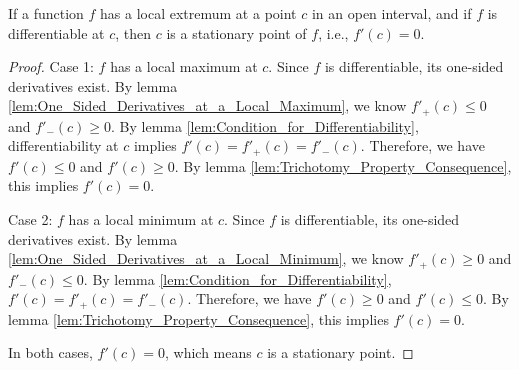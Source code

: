 \begin{theorem}
    \label{thm:Fermats_Theorem_on_Stationary_Points}
    If a function $f$ has a local extremum at a point $c$ in an open interval, and if $f$ is differentiable at $c$, then $c$ is a stationary point of $f$, i.e., $f'(c) = 0$.
\end{theorem}

\begin{proof}
    Case 1: $f$ has a local maximum at $c$.
    Since $f$ is differentiable, its one-sided derivatives exist. By lemma \ref{lem:One_Sided_Derivatives_at_a_Local_Maximum}, we know $f'_+(c) \leq 0$ and $f'_-(c) \geq 0$.
    By lemma \ref{lem:Condition_for_Differentiability}, differentiability at $c$ implies $f'(c) = f'_+(c) = f'_-(c)$.
    Therefore, we have $f'(c) \leq 0$ and $f'(c) \geq 0$. By lemma \ref{lem:Trichotomy_Property_Consequence}, this implies $f'(c) = 0$.

    Case 2: $f$ has a local minimum at $c$.
    Since $f$ is differentiable, its one-sided derivatives exist. By lemma \ref{lem:One_Sided_Derivatives_at_a_Local_Minimum}, we know $f'_+(c) \geq 0$ and $f'_-(c) \leq 0$.
    By lemma \ref{lem:Condition_for_Differentiability}, $f'(c) = f'_+(c) = f'_-(c)$.
    Therefore, we have $f'(c) \geq 0$ and $f'(c) \leq 0$. By lemma \ref{lem:Trichotomy_Property_Consequence}, this implies $f'(c) = 0$.

    In both cases, $f'(c)=0$, which means $c$ is a stationary point.
\end{proof}